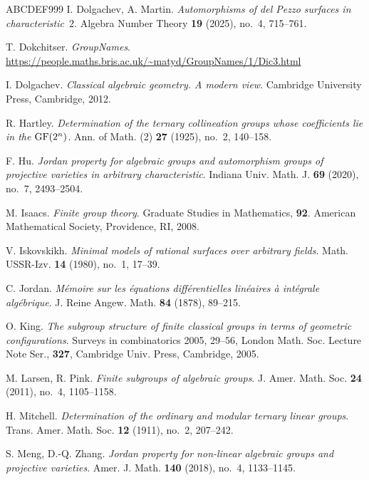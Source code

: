 \documentclass[12pt]{amsart}
\numberwithin{equation}{section}
\theoremstyle{definition}
\begin{document}
\begin{thebibliography}{ABCDEF999}
I. Dolgachev, A. Martin. \emph{Automorphisms of del Pezzo surfaces in characteristic~$2$}.
Algebra Number Theory \textbf{19} (2025), no.~4, 715--761.

T. Dokchitser. \emph{GroupNames}.
\url{https://people.maths.bris.ac.uk/~matyd/GroupNames/1/Dic3.html}

I. Dolgachev. \emph{Classical algebraic geometry. A modern view}.
Cambridge University Press, Cambridge, 2012.

R. Hartley. \emph{Determination of the ternary collineation groups
whose coefficients lie in the ${\rm GF}(2^n)$}.
Ann. of Math. (2) \textbf{27} (1925), no.~2, 140--158.

F. Hu. \emph{Jordan property for algebraic groups and automorphism groups of projective varieties in arbitrary characteristic}.
Indiana Univ. Math. J. \textbf{69} (2020), no.~7, 2493--2504.

M. Isaacs. \emph{Finite group theory}.
Graduate Studies in Mathematics, \textbf{92}.
American Mathematical Society, Providence, RI, 2008.

V. Iskovskikh. \emph{Minimal models of rational surfaces over arbitrary fields}.
Math. USSR-Izv. \textbf{14} (1980), no.~1, 17--39.


C. Jordan. \emph{M\'emoire sur les \'equations diff\'erentielles
lin\'eaires \`a int\'egrale alg\'ebrique}.
J. Reine Angew. Math. \textbf{84} (1878), 89--215.

O. King. \emph{The subgroup structure of finite classical groups in terms of geometric configurations}. Surveys in combinatorics 2005, 29--56, London Math. Soc. Lecture Note Ser., \textbf{327}, Cambridge Univ. Press, Cambridge, 2005.


M. Larsen, R. Pink.
\emph{Finite subgroups of algebraic groups}.
J. Amer. Math. Soc. \textbf{24} (2011), no.~4, 1105--1158.


H. Mitchell. \emph{Determination of the ordinary and modular ternary linear groups}.
Trans. Amer. Math. Soc. \textbf{12} (1911), no.~2, 207--242.

S. Meng, D.-Q. Zhang. \emph{Jordan property for non-linear algebraic
groups and projective varieties}.
Amer. J. Math. \textbf{140} (2018), no.~4, 1133--1145.


\end{thebibliography}
\end{document}
